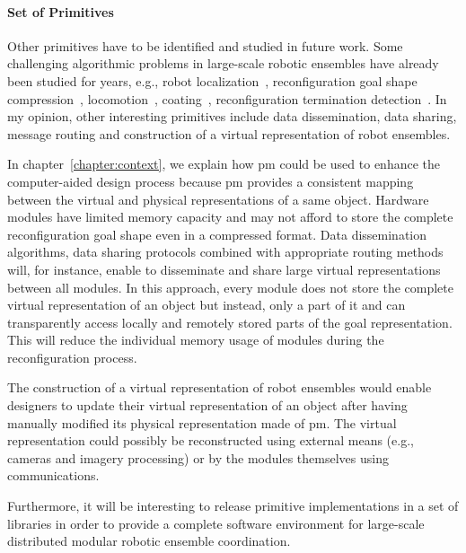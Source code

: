 \paragraph{Set of Primitives}

Other primitives have to be identified and studied in future work. Some challenging algorithmic problems in large-scale robotic ensembles have already been studied for years, e.g., robot localization~\cite{funiak-ijrr08, moffo2016first}, reconfiguration goal shape compression~\cite{tucci2017efficient}, locomotion~\cite{fitch2007scalable}, coating~\cite{derakhshandeh2017algorithmic}, reconfiguration termination detection~\cite{butler_distributed_2002}. In my opinion, other interesting primitives include data dissemination, data sharing, message routing and construction of a virtual representation of robot ensembles. 

In chapter~\ref{chapter:context}, we explain how \acrfull{pm} could be used to enhance the computer-aided design process because \gls{pm} provides a consistent mapping between the virtual and physical representations of a same object. Hardware modules have limited memory capacity and may not afford to store the complete reconfiguration goal shape even in a compressed format. Data dissemination algorithms, data sharing protocols combined with appropriate routing methods will, for instance, enable to disseminate and share large virtual representations between all modules. In this approach, every module does not store the complete virtual representation of an object but instead, only a part of it and can transparently access locally and remotely stored parts of the goal representation. This will reduce the individual memory usage of modules during the reconfiguration process.

The construction of a virtual representation of robot ensembles would enable designers to update their virtual representation of an object after having manually modified its physical representation made of \gls{pm}. The virtual representation could possibly be reconstructed using external means (e.g., cameras and imagery processing) or by the modules themselves using communications.

Furthermore, it will be interesting to release primitive implementations in a set of libraries in order to provide a complete software environment for large-scale distributed modular robotic ensemble coordination.

